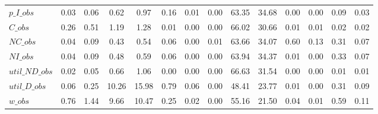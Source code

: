 \begin{center}
\begin{longtable}{lccccccccccccc}
$p\_I\_obs      $	 & 	            0.03	 & 	            0.06	 & 	            0.62	 & 	            0.97	 & 	            0.16	 & 	            0.01	 & 	            0.00	 & 	           63.35	 & 	           34.68	 & 	            0.00	 & 	            0.00	 & 	            0.09	 & 	            0.03 \\ 
$C\_obs         $	 & 	            0.26	 & 	            0.51	 & 	            1.19	 & 	            1.28	 & 	            0.01	 & 	            0.00	 & 	            0.00	 & 	           66.02	 & 	           30.66	 & 	            0.01	 & 	            0.01	 & 	            0.02	 & 	            0.02 \\ 
$NC\_obs        $	 & 	            0.04	 & 	            0.09	 & 	            0.43	 & 	            0.54	 & 	            0.06	 & 	            0.00	 & 	            0.01	 & 	           63.66	 & 	           34.07	 & 	            0.60	 & 	            0.13	 & 	            0.31	 & 	            0.07 \\ 
$NI\_obs        $	 & 	            0.04	 & 	            0.09	 & 	            0.48	 & 	            0.59	 & 	            0.06	 & 	            0.00	 & 	            0.00	 & 	           63.94	 & 	           34.37	 & 	            0.01	 & 	            0.00	 & 	            0.33	 & 	            0.07 \\ 
$util\_ND\_obs  $	 & 	            0.02	 & 	            0.05	 & 	            0.66	 & 	            1.06	 & 	            0.00	 & 	            0.00	 & 	            0.00	 & 	           66.63	 & 	           31.54	 & 	            0.00	 & 	            0.00	 & 	            0.01	 & 	            0.01 \\ 
$util\_D\_obs   $	 & 	            0.06	 & 	            0.25	 & 	           10.26	 & 	           15.98	 & 	            0.79	 & 	            0.06	 & 	            0.00	 & 	           48.41	 & 	           23.77	 & 	            0.01	 & 	            0.00	 & 	            0.31	 & 	            0.09 \\ 
$w\_obs         $	 & 	            0.76	 & 	            1.44	 & 	            9.66	 & 	           10.47	 & 	            0.25	 & 	            0.02	 & 	            0.00	 & 	           55.16	 & 	           21.50	 & 	            0.04	 & 	            0.01	 & 	            0.59	 & 	            0.11 \\ 
\end{longtable}
 \end{center}
